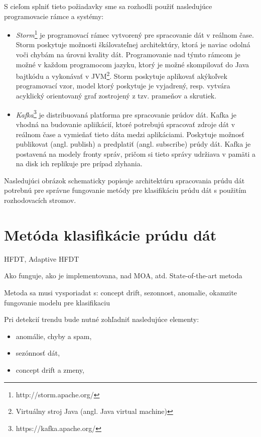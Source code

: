 S cieľom splniť tieto požiadavky sme sa rozhodli použiť nasledujúce programovacie rámce a systémy:
\begin{itemize}
	\item \textit{Storm}\footnote{http://storm.apache.org/} je programovací rámec vytvorený pre spracovanie dát v reálnom čase. Storm poskytuje možnosti škálovateľnej architektúry, ktorá je naviac odolná voči chybám na úrovni kvality dát. Programovanie nad týmto rámcom je možné v každom programocom jazyku, ktorý je možné skompilovať do Java bajtkódu a vykonávať v JVM\footnote{Virtuálny stroj Java (angl. Java virtual machine)}. Storm poskytuje aplikovať akýkoľvek programovací vzor, model ktorý poskytuje je vyjadrený, resp. vytvára acyklický orientovaný graf zostrojený z tzv. prameňov a skrutiek.
	\item \textit{Kafka}\footnote{https://kafka.apache.org/} je distribuovaná platforma pre spracovanie prúdov dát. Kafka je vhodná na budovanie apliikácií, ktoré potrebujú spracovať zdroje dát v reálnom čase a vymieňať tieto dáta medzi aplikáciami. Poskytuje možnosť publikovat (angl. publish) a predplatiť (angl. subscribe) prúdy dát. Kafka je postavená na modely fronty správ, pričom si tieto správy udržiava v pamäti a na disk ich replikuje pre prípad zlyhania.
\end{itemize}

Nasledujúci obrázok schematicky popisuje architektúru spracovania prúdu dát potrebnú pre správne fungovanie metódy pre klasifikáciu prúdu dát s použitím rozhodovacích stromov.



\section{Metóda klasifikácie prúdu dát}
\label{method-klasifikacia-prudu-dat}



HFDT, Adaptive HFDT

Ako funguje, ako je implementovana, nad MOA, atd. State-of-the-art metoda

Metoda sa musi vysporiadat s: concept drift, sezonnost, anomalie, okamzite fungovanie modelu pre klasifikaciu

Pri detekcií trendu bude nutné zohľadniť nasledujúce elementy:
\begin{itemize}
	\item anomálie, chyby a spam,
	\item sezónnosť dát,
	\item concept drift a zmeny,
\end{itemize}

